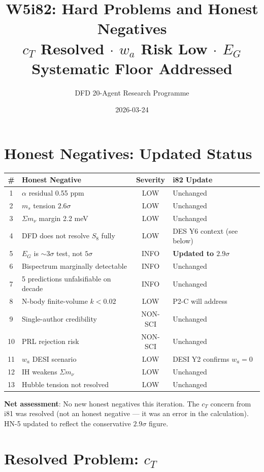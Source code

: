 \documentclass[11pt,a4paper]{article}
\title{W5i82: Hard Problems and Honest Negatives\\[6pt]
\large $c_T$ Resolved $\cdot$ $w_a$ Risk Low $\cdot$ $E_G$ Systematic Floor Addressed}
\author{DFD 20-Agent Research Programme}
\date{2026-03-24}
\begin{document}
\maketitle

\section{Honest Negatives: Updated Status}

\begin{center}
\begin{tabular}{clcl}
\toprule
\textbf{\#} & \textbf{Honest Negative} & \textbf{Severity} & \textbf{i82 Update} \\
\midrule
1 & $\alpha$ residual 0.55 ppm & LOW & Unchanged \\
2 & $m_s$ tension $2.6\sigma$ & LOW & Unchanged \\
3 & $\Sigma m_\nu$ margin 2.2 meV & LOW & Unchanged \\
4 & DFD does not resolve $S_8$ fully & LOW & DES Y6 context (see below) \\
5 & $E_G$ is $\sim 3\sigma$ test, not $5\sigma$ & INFO & \textbf{Updated to $2.9\sigma$} \\
6 & Bispectrum marginally detectable & INFO & Unchanged \\
7 & 5 predictions unfalsifiable on decade & INFO & Unchanged \\
8 & N-body finite-volume $k < 0.02$ & LOW & P2-C will address \\
9 & Single-author credibility & NON-SCI & Unchanged \\
10 & PRL rejection risk & NON-SCI & Unchanged \\
11 & $w_a$ DESI scenario & LOW & DESI Y2 confirms $w_a = 0$ \\
12 & IH weakens $\Sigma m_\nu$ & LOW & Unchanged \\
13 & Hubble tension not resolved & LOW & Unchanged \\
\bottomrule
\end{tabular}
\end{center}

\textbf{Net assessment}: No new honest negatives this iteration. The $c_T$ concern from i81 was resolved (not an honest negative --- it was an error in the calculation). HN-5 updated to reflect the conservative $2.9\sigma$ figure.

\section{Resolved Problem: $c_T$}
\end{document}
